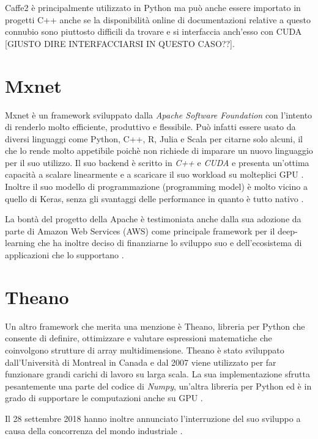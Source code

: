Caffe2 è principalmente utilizzato in Python ma può anche essere importato in progetti C++ anche se la disponibilità online di documentazioni relative a questo connubio sono piuttosto difficili da trovare \cite{caffe_c++} e si interfaccia anch'esso con CUDA [GIUSTO DIRE INTERFACCIARSI IN QUESTO CASO??].

\section{Mxnet}
Mxnet è un framework sviluppato dalla \textit{Apache Software Foundation} con l'intento di renderlo molto efficiente, produttivo e flessibile. Può infatti essere usato da diversi linguaggi come Python, C++, R, Julia e Scala per citarne solo alcuni, il che lo rende molto appetibile poichè non richiede di imparare un nuovo linguaggio per il suo utilizzo. Il suo backend è scritto in \emph{C++} e \emph{CUDA} e presenta un'ottima capacità a scalare linearmente e a scaricare il suo workload su molteplici GPU \cite{maruti:mxnet}. Inoltre il suo modello di programmazione (programming model) è molto vicino a quello di Keras, senza gli svantaggi delle performance in quanto è tutto nativo \cite{quora:mxnet}.

La bontà del progetto della Apache è testimoniata anche dalla sua adozione da parte di Amazon Web Services (AWS) come principale framework per il deep-learning che ha inoltre deciso di finanziarne lo sviluppo suo e dell'ecosistema di applicazioni che lo supportano \cite{aws-mxnet}. 
\section{Theano}
Un altro framework che merita una menzione è Theano, libreria per Python che consente di definire, ottimizzare e valutare espressioni matematiche che coinvolgono strutture di array multidimensione. 
Theano è stato sviluppato dall'Università di Montreal in Canada e dal 2007 viene utilizzato per far funzionare grandi carichi di lavoro su larga scala. La sua implementazione sfrutta pesantemente una parte del codice di \emph{Numpy}, un'altra libreria per Python ed è in grado di supportare le computazioni anche su GPU \cite{2016arXiv160502688short}.

Il 28 settembre 2018 hanno inoltre annunciato l'interruzione del suo sviluppo a causa della concorrenza del mondo industriale \cite{lamblin}.

